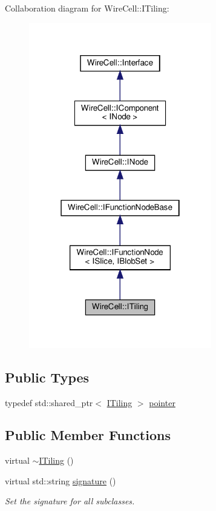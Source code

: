 Collaboration diagram for Wire\+Cell\+:\+:I\+Tiling\+:
\nopagebreak
\begin{figure}[H]
\begin{center}
\leavevmode
\includegraphics[width=226pt]{class_wire_cell_1_1_i_tiling__coll__graph}
\end{center}
\end{figure}
\subsection*{Public Types}
\begin{DoxyCompactItemize}
\item 
typedef std\+::shared\+\_\+ptr$<$ \hyperlink{class_wire_cell_1_1_i_tiling}{I\+Tiling} $>$ \hyperlink{class_wire_cell_1_1_i_tiling_a959ba0d53dd41f34e7e12c41801307de}{pointer}
\end{DoxyCompactItemize}
\subsection*{Public Member Functions}
\begin{DoxyCompactItemize}
\item 
virtual \hyperlink{class_wire_cell_1_1_i_tiling_a7bb120957e837b5e82ed0e6861a24235}{$\sim$\+I\+Tiling} ()
\item 
virtual std\+::string \hyperlink{class_wire_cell_1_1_i_tiling_a6ee9a22c6c5b01b5b56d343e5b69a243}{signature} ()
\begin{DoxyCompactList}\small\item\em Set the signature for all subclasses. \end{DoxyCompactList}\end{DoxyCompactItemize}


